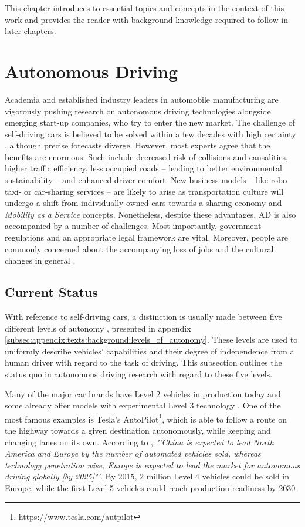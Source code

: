 This chapter introduces to essential topics and concepts in the context of this work and provides the reader with background knowledge required to follow in later chapters.

\section{Autonomous Driving}
\label{sec:background:autonomous_driving}
Academia and established industry leaders in automobile manufacturing are vigorously pushing research on autonomous driving technologies alongside emerging start-up companies, who try to enter the new market. The challenge of self-driving cars is believed to be solved within a few decades with high certainty \cite{Frost&SulivanConsulting2018}, although precise forecasts diverge. However, most experts agree that the benefits are enormous. Such include decreased risk of collisions and causalities, higher traffic efficiency, less occupied roads – leading to better environmental sustainability – and enhanced driver comfort. New business models – like robo-taxi- or car-sharing services – are likely to arise as transportation culture will undergo a shift from individually owned cars towards a sharing economy and \textit{Mobility as a Service} concepts. Nonetheless, despite these advantages, AD is also accompanied by a number of challenges. Most importantly, government regulations and an appropriate legal framework are vital. Moreover, people are commonly concerned about the accompanying loss of jobs and the cultural changes in general \cite{schoettle2014survey}. 

\subsection{Current Status}
\label{subsec:background:current_status}
With reference to self-driving cars, a distinction is usually made between five different levels of autonomy \cite{Klein}, presented in appendix \cref{subsec:appendix:texts:background:levels_of_autonomy}. These levels are used to uniformly describe vehicles' capabilities and their degree of independence from a human driver with regard to the task of driving. This subsection outlines the status quo in autonomous driving research with regard to these five levels.

Many of the major car brands have Level 2 vehicles in production today and some already offer models with experimental Level 3 technology \cite{Frost&SulivanConsulting2018}. One of the most famous examples is Tesla's AutoPilot\footnote{\url{https://www.tesla.com/autpilot}}, which is able to follow a route on the highway towards a given destination autonomously, while keeping and changing lanes on its own. According to \cite{Frost&SulivanConsulting2018}, \textit{"'China is expected to lead North America and Europe by the number of automated vehicles sold, whereas technology penetration wise, Europe is expected to lead the market for autonomous driving globally [by 2025]"'}. By 2015, 2 million Level 4 vehicles could be sold in Europe, while the first Level 5 vehicles could reach production readiness by 2030 \cite{McKinseyCenterforFutureMobility2019}. 

